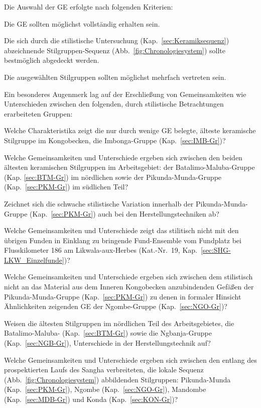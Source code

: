 \noindent Die Auswahl der GE erfolgte nach folgenden Kriterien:
\begin{itemize*}
	\renewcommand\labelitemi{--}
	\item Die GE sollten möglichst vollständig erhalten sein.
	\item Die sich durch die stilistische Untersuchung (Kap.~\ref{sec:Keramiksequenz}) abzeichnende Stilgruppen-Sequenz (Abb.~\ref{fig:Chronologiesystem}) sollte bestmöglich abgedeckt werden.
	\item Die ausgewählten Stilgruppen sollten möglichst mehrfach vertreten sein.
	\item Ein besonderes Augenmerk lag auf der Erschließung von Gemeinsamkeiten wie Unterschieden zwischen den folgenden, durch stilistische Betrachtungen erarbeiteten Gruppen:
	\begin{itemize*}
		\renewcommand\labelitemi{--}
		\item Welche Charakteristika zeigt die nur durch wenige GE belegte, älteste keramische Stilgruppe im Kongobecken, die Imbonga-Gruppe (Kap.~\ref{sec:IMB-Gr})?
		\item Welche Gemeinsamkeiten und Unterschiede ergeben sich zwischen den beiden ältesten keramischen Stilgruppen im Arbeitsgebiet: der Batalimo-Maluba-Gruppe (Kap. \ref{sec:BTM-Gr}) im nördlichen sowie der Pikunda-Munda-Gruppe (Kap.~\ref{sec:PKM-Gr}) im südlichen Teil?
		\item Zeichnet sich die schwache stilistische Variation innerhalb der Pikunda-Munda-Gruppe (Kap.~\ref{sec:PKM-Gr}) auch bei den Herstellungstechniken ab?
		\item Welche Gemeinsamkeiten und Unterschiede zeigt das stilitisch nicht mit den übrigen Funden in Einklang zu bringende Fund-Ensemble vom Fundplatz bei Flusskilometer 186 am Likwala-aux-Herbes (Kat.-Nr.~19, Kap.~\ref{sec:SHG-LKW_Einzelfunde})?
		\item Welche Gemeinsamkeiten und Unterschiede ergeben sich zwischen dem stilistisch nicht an das Material aus dem Inneren Kongobecken anzubindenden Gefäßen der Pikunda-Munda-Gruppe (Kap.~\ref{sec:PKM-Gr}) zu denen in formaler Hinsicht Ähnlichkeiten zeigenden GE der Ngombe-Gruppe (Kap.~\ref{sec:NGO-Gr})?
		\item Weisen die ältesten Stilgruppen im nördlichen Teil des Arbeitsgebietes, die Batalimo-Maluba- (Kap.~\ref{sec:BTM-Gr}) sowie die Ngbanja-Gruppe (Kap.~\ref{sec:NGB-Gr}), Unterschiede in der Herstellungstechnik auf?
		\item Welche Gemeinsamkeiten und Unterschiede ergeben sich zwischen den entlang des prospektierten Laufs des Sangha verbreiteten, die lokale Sequenz (Abb.~\ref{fig:Chronologiesystem}) abbildenden Stilgruppen: Pikunda-Munda (Kap.~\ref{sec:PKM-Gr}), Ngombe (Kap.~\ref{sec:NGO-Gr}), Mandombe (Kap.~\ref{sec:MDB-Gr}) und Konda (Kap.~\ref{sec:KON-Gr})?

\end{itemize*}
\end{itemize*}
